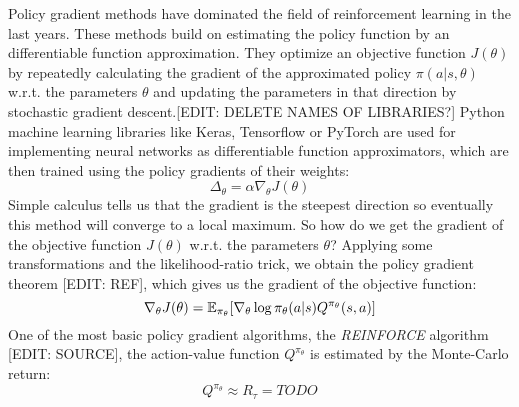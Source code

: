 Policy gradient methods have dominated the field of reinforcement learning in the last years. These methods build on estimating the policy function by an differentiable function approximation. They optimize an objective function $J(\theta)$ by repeatedly calculating the gradient of the approximated policy $\pi(a|s,\theta)$ w.r.t. the parameters $\theta$ and updating the parameters in that direction by stochastic gradient descent.[EDIT: DELETE NAMES OF LIBRARIES?] Python machine learning libraries like Keras, Tensorflow or PyTorch are used for implementing neural networks as differentiable function approximators, which are then trained using the policy gradients of their weights:
\begin{equation}
\label{equ:polupdate}
\Delta_{\theta} = \alpha \nabla_{\theta} J(\theta)
\end{equation}
Simple calculus tells us that the gradient is the steepest direction so eventually this method will converge to a local maximum. So how do we get the gradient of the objective function $J(\theta)$ w.r.t. the parameters $\theta$? Applying some transformations and the likelihood-ratio trick, we obtain the policy gradient theorem [EDIT: REF], which gives us the gradient of the objective function:
\begin{equation}
	\label{equ:policygradienttheorem}
	\nabla_{\theta}J(\theta)=\operatorname{\mathbb{E}}_{\pi_{\theta}}[\nabla_{\theta}\log\pi_{\theta}(a|s) Q^{\pi_{\theta}}(s, a)]
\end{equation}
One of the most basic policy gradient algorithms, the \textit{REINFORCE} algorithm [EDIT: SOURCE], the action-value function $Q^{\pi_{\theta}}$ is estimated by the Monte-Carlo return: 
\begin{equation}
\label{equ:reinforce}
Q^{\pi_\theta} \approx \mathit{R}_\tau = TODO
\end{equation}
